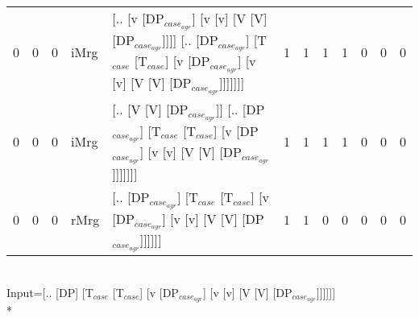 \begin{tabularx}{\linewidth}{rrrlXrrrrrrr}
   0 &       0 &   0 & iMrg & [.. [v [DP$_{case_{agr}}$] [v [v] [V [V] [DP$_{case_{agr}}$]]]] [.. [DP$_{case_{agr}}$] [T$_{case}$ [T$_{case}$] [v [DP$_{case_{agr}}$] [v [v] [V [V] [DP$_{case_{agr}}$]]]]]]]                   &             1 &             1 &                  1 &            1 &              0 &               0 &              0 \\
   0 &       0 &   0 & iMrg & [.. [V [V] [DP$_{case_{agr}}$]] [.. [DP$_{case_{agr}}$] [T$_{case}$ [T$_{case}$] [v [DP$_{case_{agr}}$] [v [v] [V [V] [DP$_{case_{agr}}$]]]]]]]                                             &             1 &             1 &                  1 &            1 &              0 &               0 &              0 \\
   0 &       0 &   0 & rMrg & [.. [DP$_{case_{agr}}$] [T$_{case}$ [T$_{case}$] [v [DP$_{case_{agr}}$] [v [v] [V [V] [DP$_{case_{agr}}$]]]]]]                                                                        &             1 &             1 &                  0 &            0 &              0 &               0 &              0 \\
\hline
\end{tabularx}\endgroup\\
\begingroup\scriptsize Input=[.. [DP] [T$_{case}$ [T$_{case}$] [v [DP$_{case_{agr}}$] [v [v] [V [V] [DP$_{case_{agr}}$]]]]]]\\*
